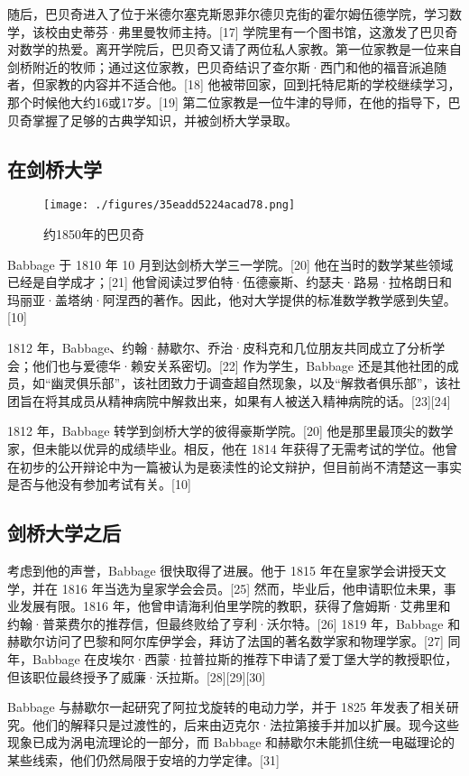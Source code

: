 随后，巴贝奇进入了位于米德尔塞克斯恩菲尔德贝克街的霍尔姆伍德学院，学习数学，该校由史蒂芬·弗里曼牧师主持。[17] 学院里有一个图书馆，这激发了巴贝奇对数学的热爱。离开学院后，巴贝奇又请了两位私人家教。第一位家教是一位来自剑桥附近的牧师；通过这位家教，巴贝奇结识了查尔斯·西门和他的福音派追随者，但家教的内容并不适合他。[18] 他被带回家，回到托特尼斯的学校继续学习，那个时候他大约16或17岁。[19] 第二位家教是一位牛津的导师，在他的指导下，巴贝奇掌握了足够的古典学知识，并被剑桥大学录取。
\subsection{在剑桥大学}
\begin{figure}[ht]
\centering
\texttt{[image: ./figures/35eadd5224acad78.png]}
\caption{约1850年的巴贝奇} \label{fig_CRSBQ_8}
\end{figure}
Babbage 于 1810 年 10 月到达剑桥大学三一学院。[20] 他在当时的数学某些领域已经是自学成才；[21] 他曾阅读过罗伯特·伍德豪斯、约瑟夫·路易·拉格朗日和玛丽亚·盖塔纳·阿涅西的著作。因此，他对大学提供的标准数学教学感到失望。[10]

1812 年，Babbage、约翰·赫歇尔、乔治·皮科克和几位朋友共同成立了分析学会；他们也与爱德华·赖安关系密切。[22] 作为学生，Babbage 还是其他社团的成员，如“幽灵俱乐部”，该社团致力于调查超自然现象，以及“解救者俱乐部”，该社团旨在将其成员从精神病院中解救出来，如果有人被送入精神病院的话。[23][24]

1812 年，Babbage 转学到剑桥大学的彼得豪斯学院。[20] 他是那里最顶尖的数学家，但未能以优异的成绩毕业。相反，他在 1814 年获得了无需考试的学位。他曾在初步的公开辩论中为一篇被认为是亵渎性的论文辩护，但目前尚不清楚这一事实是否与他没有参加考试有关。[10]
\subsection{剑桥大学之后} 
考虑到他的声誉，Babbage 很快取得了进展。他于 1815 年在皇家学会讲授天文学，并在 1816 年当选为皇家学会会员。[25] 然而，毕业后，他申请职位未果，事业发展有限。1816 年，他曾申请海利伯里学院的教职，获得了詹姆斯·艾弗里和约翰·普莱费尔的推荐信，但最终败给了亨利·沃尔特。[26] 1819 年，Babbage 和赫歇尔访问了巴黎和阿尔库伊学会，拜访了法国的著名数学家和物理学家。[27] 同年，Babbage 在皮埃尔·西蒙·拉普拉斯的推荐下申请了爱丁堡大学的教授职位，但该职位最终授予了威廉·沃拉斯。[28][29][30]

Babbage 与赫歇尔一起研究了阿拉戈旋转的电动力学，并于 1825 年发表了相关研究。他们的解释只是过渡性的，后来由迈克尔·法拉第接手并加以扩展。现今这些现象已成为涡电流理论的一部分，而 Babbage 和赫歇尔未能抓住统一电磁理论的某些线索，他们仍然局限于安培的力学定律。[31]

